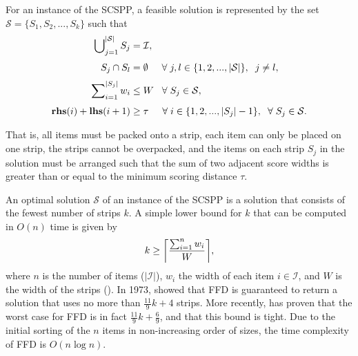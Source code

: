 \documentclass[oribibl]{llncs}
\begin{document}
For an instance of the SCSPP, a feasible solution is represented by the set $\mathcal{S} = \{S_1, S_2, ..., S_k\}$ such that
\begin{subequations}
	\begin{align}
		\bigcup\nolimits_{j=1}^{|\mathcal{S}|} S_j &= \mathcal{I}, \label{eqn:packall}\\[3pt]
		S_j \cap S_l &= \emptyset \hspace{5mm} \forall \hspace{1mm} j, l \in \{1, 2, ..., |\mathcal{S}|\}, \hspace{2mm} j \neq l, \label{eqn:nooverlap} \\[3pt]
		\sum\nolimits_{i=1}^{|S_j|}w_i & \leq W \hspace{3mm} \forall \hspace{1mm} S_j \in \mathcal{S}, \label{eqn:capacity} \\[3pt]
		\textup{\textbf{rhs}}(i) + \textup{\textbf{lhs}}(i+1) &\geq \tau \hspace {5mm} \forall \hspace{1mm} i \in \{1, 2, ..., |S_j|-1\}, \hspace{2mm} \forall \hspace{1mm} S_j \in \mathcal{S}. \label{eqn:vscstrip}
\end{align}
\end{subequations}

That is, all items must be packed onto a strip, each item can only be placed on one strip, the strips cannot be overpacked, and the items on each strip $S_j$ in the solution must be arranged such that the sum of two adjacent score widths is greater than or equal to the minimum scoring distance $\tau$.

An optimal solution $\mathcal{S}$ of an instance of the SCSPP is a solution that consists of the fewest number of strips $k$. A simple lower bound for $k$ that can be computed in $O(n)$ time is given by 
\begin{equation}
\label{eqn:lowerbound}
k \geq \ceil*{\frac{\sum_{i=1}^{n}w_i}{W}},
\end{equation}
where $n$ is the number of items ($|\mathcal{I}|$), $w_i$ the width of each item $i \in \mathcal{I}$, and $W$ is the width of the strips (\citealp{martello1990b}). In 1973, \citeauthor{johnson1973} showed that FFD is guaranteed to return a solution that uses no more than $\frac{11}{9}k + 4$ strips. More recently, \cite{dosa2007} has proven that the worst case for FFD is in fact $\frac{11}{9}k + \frac{6}{9}$, and that this bound is tight. Due to the initial sorting of the $n$ items in non-increasing order of sizes, the time complexity of FFD is $O(n\log n)$.
\end{document}

